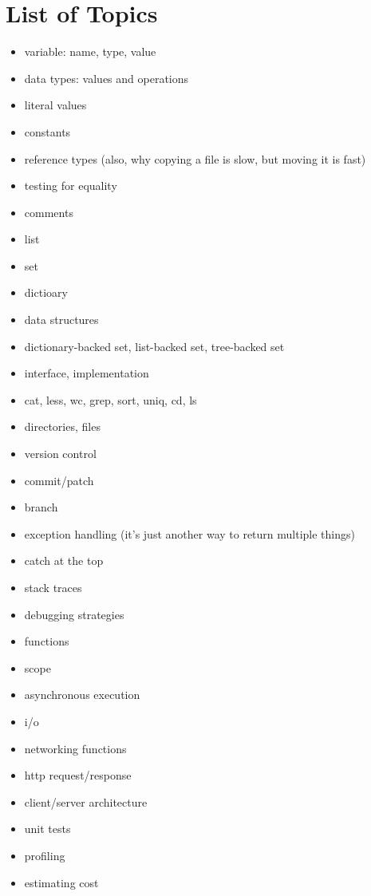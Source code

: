 \section{List of Topics}
\begin{itemize}
  \item variable: name, type, value
  \item data types: values and operations
  \item literal values
  \item constants
  \item reference types (also, why copying a file is slow, but moving it is fast)
  \item testing for equality
  \item comments

  \item list
  \item set
  \item dictioary
  \item data structures
  \item dictionary-backed set, list-backed set, tree-backed set
  \item interface, implementation

  \item cat, less, wc, grep, sort, uniq, cd, ls
  \item directories, files

  \item version control
  \item commit/patch
  \item branch

  \item exception handling (it's just another way to return multiple things)
  \item catch at the top
  \item stack traces
  \item debugging strategies

  \item functions
  \item scope
  \item asynchronous execution
  \item i/o
  \item networking functions

  \item http request/response
  \item client/server architecture

  \item unit tests
  \item profiling
  \item estimating cost


\end{itemize}
